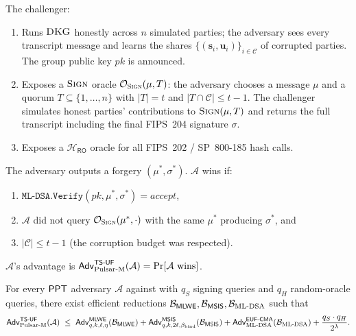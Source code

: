 \begin{game}[TS-UF]
\label{game:tsuf}
The challenger:
\begin{enumerate}[leftmargin=*, itemsep=0pt]
\item Runs $\textsc{DKG}$ honestly across $n$ simulated parties; the adversary
sees every transcript message and learns the shares
$\{(\mathbf{s}_i, \mathbf{u}_i)\}_{i \in \mathcal{C}}$ of corrupted
parties. The group public key $\mathit{pk}$ is announced.
\item Exposes a $\textsc{Sign}$ oracle $\mathcal{O}_{\textsc{Sign}}(\mu, T)$: the
adversary chooses a message $\mu$ and a quorum
$T \subseteq \{1, \dots, n\}$ with $|T| = t$ and
$|T \cap \mathcal{C}| \le t-1$. The challenger simulates honest
parties' contributions to $\textsc{Sign}(\mu, T)$ and returns the full
transcript including the final FIPS~204 signature $\sigma$.
\item Exposes a $\mathcal{H}_{\mathsf{RO}}$ oracle for all FIPS~202 / SP~800-185 hash
calls.
\end{enumerate}

The adversary outputs a forgery $(\mu^*, \sigma^*)$. $\mathcal{A}$
wins if:
\begin{enumerate}[label=(\roman*), leftmargin=*, itemsep=0pt]
\item $\texttt{ML-DSA.Verify}(\mathit{pk}, \mu^*, \sigma^*) = \mathit{accept}$,
\item $\mathcal{A}$ did not query $\mathcal{O}_{\textsc{Sign}}(\mu^*, \cdot)$ with
the same $\mu^*$ producing $\sigma^*$, and
\item $|\mathcal{C}| \le t-1$ (the corruption budget was respected).
\end{enumerate}
$\mathcal{A}$'s advantage is
$\mathsf{Adv}^{\mathsf{TS\textsf{-}UF}}_{\mathrm{Pulsar\text{-}M}}(\mathcal{A}) = \Pr[\mathcal{A} \text{ wins}]$.
\end{game}

\begin{theorem}[TS-UF security]
\label{thm:tsuf}
For every $\mathsf{PPT}$ adversary $\mathcal{A}$ against  with
$q_S$ signing queries and $q_H$ random-oracle queries, there exist
efficient reductions $\mathcal{B}_{\mathsf{MLWE}}, \mathcal{B}_{\mathsf{MSIS}},
\mathcal{B}_{\mathrm{ML\text{-}DSA}}$ such that
\[
\mathsf{Adv}^{\mathsf{TS\textsf{-}UF}}_{\mathrm{Pulsar\text{-}M}}(\mathcal{A})
\;\le\;
\mathsf{Adv}^{\mathsf{MLWE}}_{q, k, \ell, \eta}(\mathcal{B}_{\mathsf{MLWE}})
+ \mathsf{Adv}^{\mathsf{MSIS}}_{q, k, 2\ell, \beta_{\mathrm{bind}}}(\mathcal{B}_{\mathsf{MSIS}})
+ \mathsf{Adv}^{\mathsf{EUF\textsf{-}CMA}}_{\mathrm{ML\text{-}DSA}}(\mathcal{B}_{\mathrm{ML\text{-}DSA}})
+ \frac{q_S \cdot q_H}{2^\lambda}.
\]
\end{theorem}

